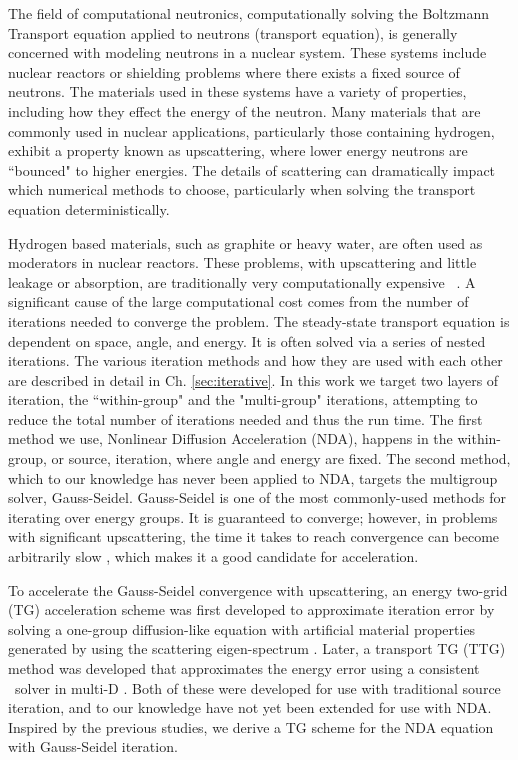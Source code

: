 


The field of computational neutronics, computationally solving the Boltzmann Transport equation applied to neutrons (transport equation), is generally concerned with modeling neutrons in a nuclear system. These systems include nuclear reactors or shielding problems where there exists a fixed source of neutrons. The materials used in these systems have a variety of properties, including how they effect the energy of the neutron. Many materials that are commonly used in nuclear applications, particularly those containing hydrogen, exhibit a property known as upscattering, where lower energy neutrons are ``bounced" to higher energies. The details of scattering can dramatically impact which numerical methods to choose, particularly when solving the transport equation deterministically. 

Hydrogen based materials, such as graphite or heavy water, are often used as moderators in nuclear reactors. These problems, with upscattering and little leakage or absorption, are traditionally very computationally expensive ~\cite{morel-upscat}. A significant cause of the large computational cost comes from the number of iterations needed to converge the problem. The steady-state transport equation is dependent on space, angle, and energy. It is often solved via a series of nested iterations. The various iteration methods and how they are used with each other are described in detail in Ch. \ref{sec:iterative}. In this work we target two layers of iteration, the ``within-group" and the "multi-group" iterations, attempting to reduce the total number of iterations needed and thus the run time. The first method we use, Nonlinear Diffusion Acceleration (NDA), happens in the within-group, or source, iteration, where angle and energy are fixed. The second method, which to our knowledge has never been applied to NDA, targets the multigroup solver, Gauss-Seidel. Gauss-Seidel is one of the most commonly-used methods for iterating over energy groups. It is guaranteed to converge; however, in problems with significant upscattering, the time it takes to reach convergence can become arbitrarily slow \cite{evans-upscat}, which makes it a good candidate for acceleration. 

To accelerate the Gauss-Seidel convergence with upscattering, an energy two-grid (TG) acceleration scheme was first developed to approximate iteration error by solving a one-group diffusion-like equation with artificial material properties generated by using the scattering eigen-spectrum \cite{morel-upscat}. Later, a transport TG (TTG) method was developed that approximates the energy error using a consistent \sn\ solver in multi-D \cite{evans-upscat}. Both of these were developed for use with traditional source iteration, and to our knowledge have not yet been extended for use with NDA. Inspired by the previous studies, we derive a TG scheme for the NDA equation with Gauss-Seidel iteration.


